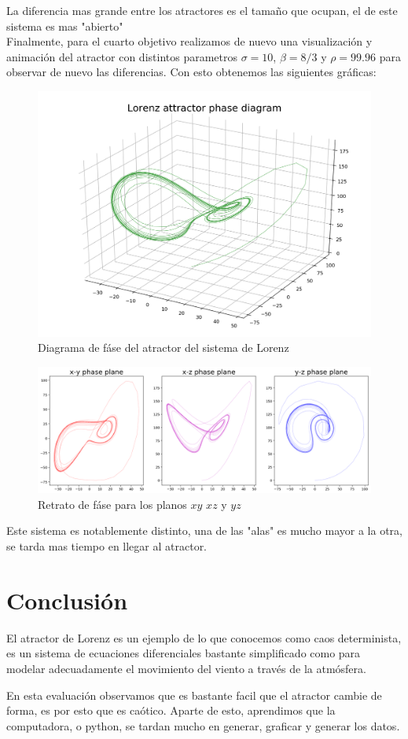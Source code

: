 \documentclass{article}
\begin{document}
\newpage

La diferencia mas grande entre los atractores es el tamaño que ocupan, el de este sistema es mas "abierto"
~\\

Finalmente, para el cuarto objetivo realizamos de nuevo una visualización y animación del atractor con distintos parametros $\sigma=10$, $\beta=8/3$ y $\rho=99.96$ para observar de nuevo las diferencias. Con esto obtenemos las siguientes gráficas:
\begin{figure}[ht!]
\centering
\includegraphics[width=0.5\linewidth]{ej4-pd.png}
\caption{Diagrama de fáse del atractor del sistema de Lorenz}
\end{figure}

\begin{figure}[ht!]
\centering
\includegraphics[width=\linewidth]{ej4-pp.png}
\caption{Retrato de fáse para los planos $xy$ $xz$ y $yz$}
\end{figure}

\newpage

Este sistema es notablemente distinto, una de las "alas" es mucho mayor a la otra, se tarda mas tiempo en llegar al atractor.

\section{Conclusión}

El atractor de Lorenz es un ejemplo de lo que conocemos como caos determinista, es un sistema de ecuaciones diferenciales bastante simplificado como para modelar adecuadamente el movimiento del viento a través de la atmósfera.

En esta evaluación observamos que es bastante facil que el atractor cambie de forma, es por esto que es caótico. Aparte de esto, aprendimos que la computadora, o python, se tardan mucho en generar, graficar y generar los datos.
\end{document}
